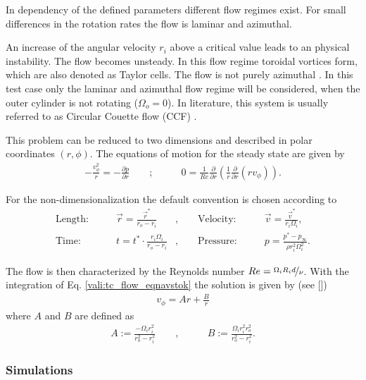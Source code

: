 In dependency of the defined parameters different flow regimes exist.
For small differences in the rotation rates the flow is laminar and azimuthal.

An increase of the angular velocity $r_i$ above a critical value leads to an physical instability. The flow becomes unsteady.
In this flow regime toroidal vortices form, which are also denoted as Taylor cells.
The flow is not purely azimuthal \citep{tritton88}.
In this test case only the laminar and azimuthal flow regime will be considered, when the outer cylinder is not rotating ($\Omega_o = 0$).
In literature, this system is usually referred to as Circular Couette flow (CCF) \citep{Kundu2012}.

This problem can be reduced to two dimensions and described in polar coordinates $(r, \phi)$. The equations of motion for the steady state are given by \citep{Kundu2012}
\begin{align}
    \label{vali:tc_flow_eqnavstok}
    -\frac{v^2_\phi}{r} = - \frac{\partial p}{\partial r} \qquad ;& \qquad 0 = \frac{1}{Re}\frac{\partial}{\partial r}\left(\frac{1}{r}\frac{\partial}{\partial r}(r v_\phi)\right).
\end{align}


For the non-dimensionalization the default convention is chosen according to  \citep{Chen2015}
\begin{align}
    \text{Length:}\qquad &  \vec{r} = \frac{\vec{r}^*}{r_o - r_i}  &,
    \qquad \text{Velocity:}\qquad& \vec{v} =  \frac{\vec{v}^*}{r_i\Omega_i},\\
    \text{Time:}  \qquad & t = t^* \cdot \frac{r_i \Omega_i}{r_o - r_i}&,
    \qquad  \text{Pressure:}\qquad & p = \frac{p^* - p_\infty}{\rho r_i^2\Omega_i^2}.
\end{align}


The flow is then characterized by the Reynolds number $Re = \nicefrac{\Omega_i R_i d}{\nu}$.
With the integration of Eq. \ref{vali:tc_flow_eqnavstok} the solution is given by (see [\citep{Kundu2012}])
\begin{align}
    v_\phi = Ar + \frac{B}{r}
\end{align}
where $A$ and $B$ are defined as
\begin{align}
    A := \frac{-\Omega_i r_i^2}{r^2_o - r^2_i} \qquad ,& \qquad B := \frac{\Omega_i r^2_i r^2_o}{r^2_o - r^2_i}.
\end{align}

\subsubsection{Simulations}

